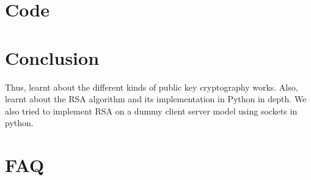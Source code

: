 \documentclass[11pt]{article}
\begin{document}
\section{Code}


\section{Conclusion}
Thus, learnt about the different kinds of public key cryptography works. Also, learnt about the RSA algorithm and its implementation in Python in depth. We also tried to implement RSA on a dummy client server model using sockets in python.
\clearpage

\section{FAQ}
\end{document}
